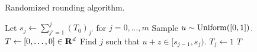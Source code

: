 \begin{algorithm}[h!]
\caption{Randomized rounding algorithm.}
\label{alg:round}
\begin{algorithmic}[1]
\State Let $s_j \gets \sum_{j'=1}^j (T_0)_{j'}$ for $j = 0,\ldots,m$ 
\State Sample $u \sim \operatorname{Uniform}([0,1])$.
\State $T \gets [0,\ldots,0] \in \mathbf{R}^d$
\State Find $j$ such that $u+z \in [s_{j-1},s_j)$. 
\State $T_j \gets 1$
\EndFor
\State \Return $T$
\EndProcedure
\end{algorithmic}
\end{algorithm}
